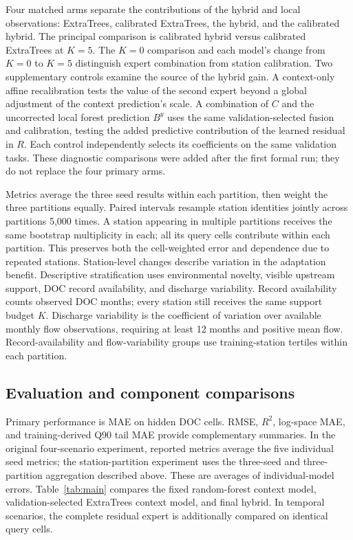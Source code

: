 \documentclass[11pt]{article}
\begin{document}
Four matched arms separate the contributions of the hybrid and local observations: ExtraTrees, calibrated ExtraTrees, the hybrid, and the calibrated hybrid. The principal comparison is calibrated hybrid versus calibrated ExtraTrees at $K=5$. The $K=0$ comparison and each model's change from $K=0$ to $K=5$ distinguish expert combination from station calibration. Two supplementary controls examine the source of the hybrid gain. A context-only affine recalibration tests the value of the second expert beyond a global adjustment of the context prediction's scale. A combination of $C$ and the uncorrected local forest prediction $B^y$ uses the same validation-selected fusion and calibration, testing the added predictive contribution of the learned residual in $R$. Each control independently selects its coefficients on the same validation tasks. These diagnostic comparisons were added after the first formal run; they do not replace the four primary arms.

Metrics average the three seed results within each partition, then weight the three partitions equally. Paired intervals resample station identities jointly across partitions 5,000 times. A station appearing in multiple partitions receives the same bootstrap multiplicity in each; all its query cells contribute within each partition. This preserves both the cell-weighted error and dependence due to repeated stations. Station-level changes describe variation in the adaptation benefit. Descriptive stratification uses environmental novelty, visible upstream support, DOC record availability, and discharge variability. Record availability counts observed DOC months; every station still receives the same support budget $K$. Discharge variability is the coefficient of variation over available monthly flow observations, requiring at least 12 months and positive mean flow. Record-availability and flow-variability groups use training-station tertiles within each partition.

\subsection{Evaluation and component comparisons}
Primary performance is MAE on hidden DOC cells. RMSE, $R^2$, log-space MAE, and training-derived Q90 tail MAE provide complementary summaries. In the original four-scenario experiment, reported metrics average the five individual seed metrics; the station-partition experiment uses the three-seed and three-partition aggregation described above. These are averages of individual-model errors. Table~\ref{tab:main} compares the fixed random-forest context model, validation-selected ExtraTrees context model, and final hybrid. In temporal scenarios, the complete residual expert is additionally compared on identical query cells.
\end{document}
